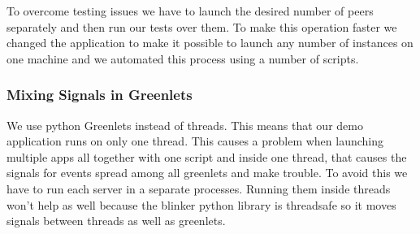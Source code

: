 To overcome testing issues we have to launch the desired number of peers separately and then run our tests 
over them. To make this operation faster we changed the application to make it possible to launch any number
of instances on one machine and we automated this process using a number of scripts. %

\subsubsection{Mixing Signals in Greenlets}
We use python Greenlets instead of threads. This means that our demo application runs on only one thread. 
This causes a problem when launching multiple apps all together with one script and inside one thread, that
causes the signals for events spread among all greenlets and make trouble. To avoid this we have to run
each server in a separate processes. Running them inside threads won't help as well because the blinker python
library is threadsafe so it moves signals between threads as well as greenlets.